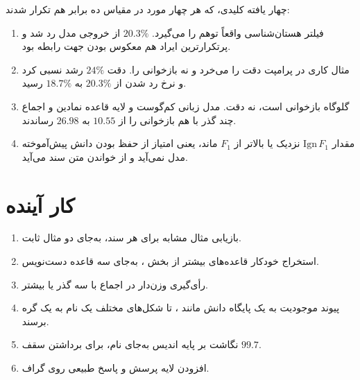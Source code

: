 چهار یافته کلیدی، که هر چهار مورد در مقیاس ده برابر هم تکرار شدند:

\begin{enumerate}
\item فیلتر هستان‌شناسی واقعاً توهم را می‌گیرد. $20.3\%$ از خروجی مدل رد شد و پرتکرارترین ایراد هم معکوس بودن جهت رابطه بود.
\item مثال کاری در پرامپت دقت را می‌خرد و نه بازخوانی را. دقت $24\%$ رشد نسبی کرد و نرخ رد شدن از $20.3\%$ به $18.7\%$ رسید.
\item گلوگاه بازخوانی است، نه دقت. مدل زبانی کم‌گوست و لایه قاعده نمادین و اجماع چند گذر با هم بازخوانی را از $10.55$ به $26.98$ رساندند.
\item مقدار $\mathrm{Ign}\,F_1$ نزدیک یا بالاتر از $F_1$ ماند، یعنی امتیاز از حفظ بودن دانش پیش‌آموخته مدل نمی‌آید و از خواندن متن سند می‌آید.
\end{enumerate}

\section{کار آینده}
\label{sec:future}

\begin{enumerate}
\item بازیابی مثال مشابه برای هر سند، به‌جای دو مثال ثابت.
\item استخراج خودکار قاعده‌های بیشتر از بخش ، به‌جای سه قاعده دست‌نویس.
\item رأی‌گیری وزن‌دار در اجماع با سه گذر یا بیشتر.
\item پیوند موجودیت به یک پایگاه دانش مانند ، تا شکل‌های مختلف یک نام به یک گره برسند.
\item نگاشت بر پایه اندیس به‌جای نام، برای برداشتن سقف $99.7$.
\item افزودن لایه پرسش و پاسخ طبیعی روی گراف.
\end{enumerate}
